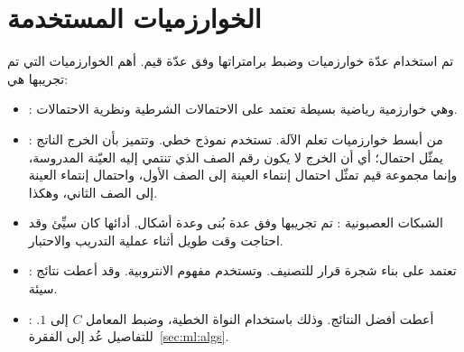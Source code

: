 \section{الخوارزميات المستخدمة}
تم استخدام عدّة خوارزميات وضبط برامتراتها وفق عدّة قيم.
أهم الخوارزميات التي تم تجريبها هي:
\begin{itemize}
	\item 
	 :
	 وهي خوارزمية رياضية بسيطة تعتمد على الاحتمالات الشرطية ونظرية الاحتمالات.
	 
	 \item 
	 :
	 من أبسط خوارزميات تعلم الآلة.
	 تستخدم نموذج خطي.
	 وتتميز بأن الخرج الناتج يمثّل احتمال؛
	 أي أن الخرج لا يكون رقم الصف الذي تنتمي إليه العيّنة المدروسة،
	 وإنما مجموعة قيم تمثّل احتمال إنتماء العينة إلى الصف الأول، واحتمال إنتماء العينة إلى الصف الثاني، وهكذا.
	 
	 \item 
	 الشبكات العصبونية :
	 تم تجريبها وفق عدة بُنى وعدة أشكال.
	 أدائها كان سيِّئ وقد احتاجت وقت طويل أثناء عملية التدريب والاحتبار.
	 \item 
	 
	 :
	تعتمد على بناء شجرة قرار للتصنيف. وتستخدم مفهوم الانتروبية. وقد أعطت نتائج سيئة.
	 
	 \item
	 :
	أعطت أفضل النتائج.
	وذلك باستخدام النواة الخطية، وضبط المعامل $C$ إلى $1$.
	للتفاصيل عُد إلى الفقرة~\ref{sec:ml:algs}.
\end{itemize}


